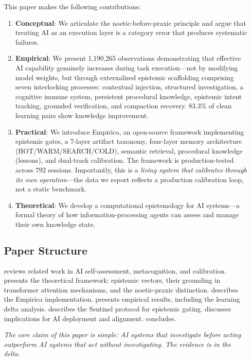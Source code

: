 This paper makes the following contributions:

\begin{enumerate}
    \item \textbf{Conceptual}: We articulate the noetic-before-praxic principle and argue that treating AI as an execution layer is a category error that produces systematic failures.

    \item \textbf{Empirical}: We present 1,190,265 observations demonstrating that effective AI capability genuinely increases during task execution---not by modifying model weights, but through externalized epistemic scaffolding comprising seven interlocking processes: contextual injection, structured investigation, a cognitive immune system, persistent procedural knowledge, epistemic intent tracking, grounded verification, and compaction recovery. 83.3\% of clean learning pairs show knowledge improvement.

    \item \textbf{Practical}: We introduce Empirica, an open-source framework implementing epistemic gates, a 7-layer artifact taxonomy, four-layer memory architecture (HOT/WARM/SEARCH/COLD), semantic retrieval, procedural knowledge (lessons), and dual-track calibration. The framework is production-tested across 792 sessions. Importantly, this is a \emph{living system that calibrates through its own operation}---the data we report reflects a production calibration loop, not a static benchmark.

    \item \textbf{Theoretical}: We develop a computational epistemology for AI systems---a formal theory of how information-processing agents can assess and manage their own knowledge state.
\end{enumerate}

\subsection{Paper Structure}

 reviews related work in AI self-assessment, metacognition, and calibration.  presents the theoretical framework: epistemic vectors, their grounding in transformer attention mechanisms, and the noetic-praxic distinction.  describes the Empirica implementation.  presents empirical results, including the learning delta analysis.  describes the Sentinel protocol for epistemic gating.  discusses implications for AI deployment and alignment.  concludes.

\medskip
\noindent\emph{The core claim of this paper is simple: AI systems that investigate before acting outperform AI systems that act without investigating. The evidence is in the delta.}
